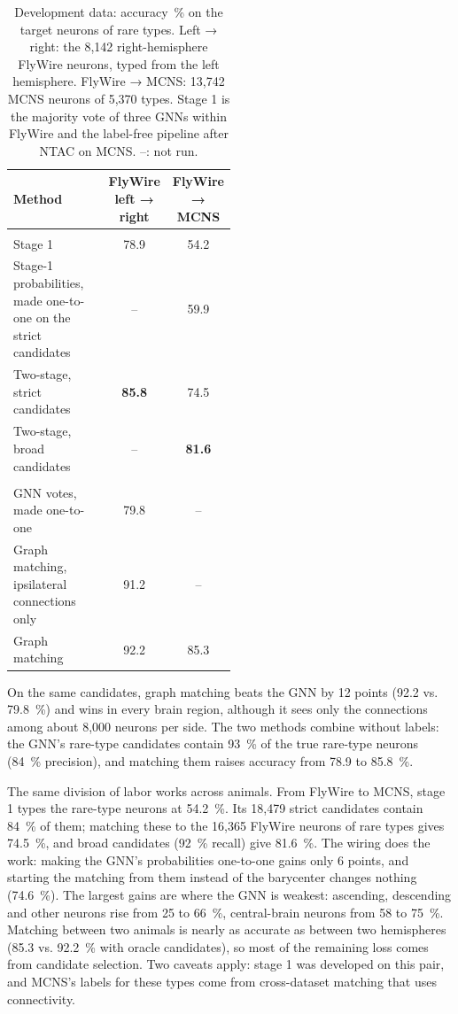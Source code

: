 \documentclass[11pt,a4paper]{article}
\begin{document}
\begin{table}[tbp]
\centering
\footnotesize
\caption{Development data: accuracy~\% on the target neurons of rare types. Left → right: the 8,142 right-hemisphere FlyWire neurons, typed from the left hemisphere. FlyWire → MCNS: 13,742 MCNS neurons of 5,370 types. Stage 1 is the majority vote of three GNNs within FlyWire and the label-free pipeline after NTAC on MCNS. –: not run.}\label{tab:dev}
\begin{tabularx}{\linewidth}{>{\raggedright\arraybackslash}p{0.5\linewidth}CC}
\toprule
Method & FlyWire left → right & FlyWire → MCNS \\
\midrule
{} \\
Stage 1 & 78.9 & 54.2 \\
Stage-1 probabilities, made one-to-one on the strict candidates & – & 59.9 \\
Two-stage, strict candidates & \textbf{85.8} & 74.5 \\
Two-stage, broad candidates & – & \textbf{81.6} \\
\midrule
{} \\
GNN votes, made one-to-one & 79.8 & – \\
Graph matching, ipsilateral connections only & 91.2 & – \\
Graph matching & 92.2 & 85.3 \\
\bottomrule
\end{tabularx}
\end{table}

On the same candidates, graph matching beats the GNN by 12 points (92.2 vs. 79.8~\%) and wins in every brain region, although it sees only the connections among about 8,000 neurons per side. The two methods combine without labels: the GNN's rare-type candidates contain 93~\% of the true rare-type neurons (84~\% precision), and matching them raises accuracy from 78.9 to 85.8~\%.

The same division of labor works across animals. From FlyWire to MCNS, stage 1 types the rare-type neurons at 54.2~\%. Its 18,479 strict candidates contain 84~\% of them; matching these to the 16,365 FlyWire neurons of rare types gives 74.5~\%, and broad candidates (92~\% recall) give 81.6~\%. The wiring does the work: making the GNN's probabilities one-to-one gains only 6 points, and starting the matching from them instead of the barycenter changes nothing (74.6~\%). The largest gains are where the GNN is weakest: ascending, descending and other neurons rise from 25 to 66~\%, central-brain neurons from 58 to 75~\%. Matching between two animals is nearly as accurate as between two hemispheres (85.3 vs. 92.2~\% with oracle candidates), so most of the remaining loss comes from candidate selection. Two caveats apply: stage 1 was developed on this pair, and MCNS's labels for these types come from cross-dataset matching that uses connectivity.
\end{document}
